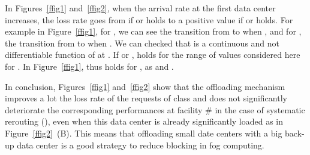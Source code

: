 \documentclass{amsart}
\begin{document}
In Figures~\ref{ffig1} and~\ref{ffig2}, when the arrival rate  at the first data center increases, the loss rate  goes from  if  or  holds to a positive value if  or   holds. For example in Figure~\ref{ffig1}, for , we can see the transition from  to  when , and for , the transition from  to  when . We can checked that  is a continuous and not differentiable function of  at . If  or ,  holds for the range of values  considered here for .
In Figure~\ref{ffig1},  thus  holds for , as  and .

In conclusion, Figures~\ref{ffig1} and~\ref{ffig2} show that the offloading mechanism improves a lot the loss rate  of the requests of class  and does not significantly deteriorate the corresponding performances at facility \# in the case of systematic rerouting (), even when this data center is already significantly loaded as in Figure~\ref{ffig2}~(B). This means that offloading small date centers with a big back-up data center is a good strategy to reduce blocking in fog computing.
\end{document}
